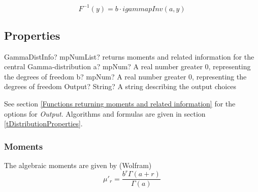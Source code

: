 %
%

\vspace{0.3cm}
\begin{equation} 
	F^{-1}(y)= b \cdot igammapInv(a,y)
\end{equation}



\subsection{Properties}
\label{GammaDistributionProperties}


\begin{mpFunctionsExtract}
	\mpFunctionTwo
	{GammaDistInfo? mpNumList? returns moments and related information for the central Gamma-distribution}
	{a? mpNum? A real number greater 0, representing the degrees of freedom}
	{b? mpNum? A real number greater 0, representing the degrees of freedom}
	{Output? String? A string describing the output choices}
\end{mpFunctionsExtract}

\vspace{0.3cm}

See section \ref{Functions returning moments and related information} for the options for {\itshape\sffamily Output}. Algorithms and formulas are given in section \ref{tDistributionProperties}.



\subsubsection{Moments}
The algebraic moments are given by (Wolfram)
\begin{equation} 
	\mu'_r = \frac{b^r \Gamma(a+r)}{\Gamma(a)}
\end{equation}



